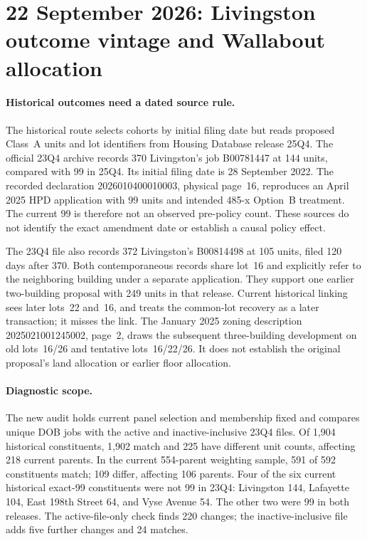\section{22 September 2026: Livingston outcome vintage and Wallabout allocation}

\paragraph{Historical outcomes need a dated source rule.}
The historical route selects cohorts by initial filing date but reads proposed
Class~A units and lot identifiers from Housing Database release 25Q4. The
official 23Q4 archive records 370 Livingston's job B00781447 at 144 units,
compared with 99 in 25Q4. Its initial filing date is 28 September 2022.
The recorded declaration 2026010400010003, physical page~16, reproduces an
April 2025 HPD application with 99 units and intended 485-x Option~B treatment.
The current 99 is therefore not an observed pre-policy count. These sources
do not identify the exact amendment date or establish a causal policy effect.

The 23Q4 file also records 372 Livingston's B00814498 at 105 units, filed
120 days after 370. Both contemporaneous records share lot~16 and explicitly
refer to the neighboring building under a separate application. They support
one earlier two-building proposal with 249 units in that release. Current
historical linking sees later lots~22 and~16, and treats the common-lot recovery
as a later transaction; it misses the link. The January 2025 zoning description
2025021001245002, page~2, draws the subsequent three-building development on
old lots~16/26 and tentative lots~16/22/26. It does not establish the original
proposal's land allocation or earlier floor allocation.

\paragraph{Diagnostic scope.}
The new audit holds current panel selection and membership fixed and compares
unique DOB jobs with the active and inactive-inclusive 23Q4 files. Of 1,904
historical constituents, 1,902 match and 225 have different unit counts,
affecting 218 current parents. In the current 554-parent weighting sample,
591 of 592 constituents match; 109 differ, affecting 106 parents. Four of the
six current historical exact-99 constituents were not 99 in 23Q4:
Livingston 144, Lafayette 104, East 198th Street 64, and Vyse Avenue 54.
The other two were 99 in both releases. The active-file-only check finds 220
changes; the inactive-inclusive file adds five further changes and 24 matches.


